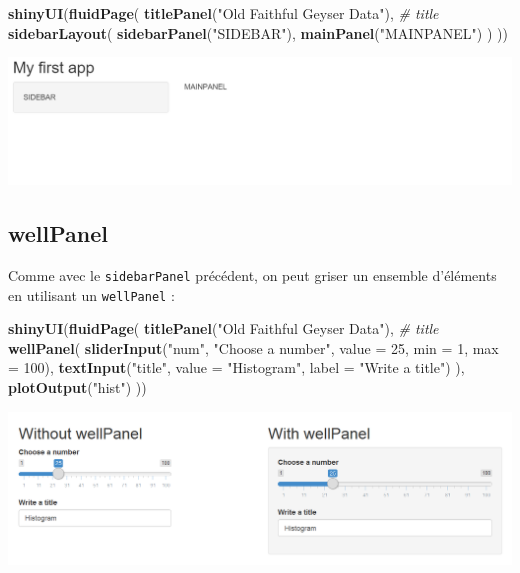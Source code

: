 \documentclass[]{article}
\newenvironment{Shaded}{\begin{snugshade}}{\end{snugshade}}
\newcommand{\KeywordTok}[1]{\textcolor[rgb]{0.13,0.29,0.53}{\textbf{#1}}}
\newcommand{\DataTypeTok}[1]{\textcolor[rgb]{0.13,0.29,0.53}{#1}}
\newcommand{\DecValTok}[1]{\textcolor[rgb]{0.00,0.00,0.81}{#1}}
\newcommand{\StringTok}[1]{\textcolor[rgb]{0.31,0.60,0.02}{#1}}
\newcommand{\CommentTok}[1]{\textcolor[rgb]{0.56,0.35,0.01}{\textit{#1}}}
\newcommand{\NormalTok}[1]{#1}
\begin{document}
\begin{Shaded}
\begin{Highlighting}[]
\KeywordTok{shinyUI}\NormalTok{(}\KeywordTok{fluidPage}\NormalTok{(}
  \KeywordTok{titlePanel}\NormalTok{(}\StringTok{"Old Faithful Geyser Data"}\NormalTok{), }\CommentTok{# title}
  \KeywordTok{sidebarLayout}\NormalTok{(}
    \KeywordTok{sidebarPanel}\NormalTok{(}\StringTok{"SIDEBAR"}\NormalTok{),}
    \KeywordTok{mainPanel}\NormalTok{(}\StringTok{"MAINPANEL"}\NormalTok{)}
\NormalTok{  )}
\NormalTok{))}
\end{Highlighting}
\end{Shaded}

\includegraphics{img/sidabar.png}

\subsection{wellPanel}\label{wellpanel}

Comme avec le \texttt{sidebarPanel} précédent, on peut griser un
ensemble d'éléments en utilisant un \texttt{wellPanel} :

\begin{Shaded}
\begin{Highlighting}[]
\KeywordTok{shinyUI}\NormalTok{(}\KeywordTok{fluidPage}\NormalTok{(}
  \KeywordTok{titlePanel}\NormalTok{(}\StringTok{"Old Faithful Geyser Data"}\NormalTok{), }\CommentTok{# title}
  \KeywordTok{wellPanel}\NormalTok{(}
    \KeywordTok{sliderInput}\NormalTok{(}\StringTok{"num"}\NormalTok{, }\StringTok{"Choose a number"}\NormalTok{, }\DataTypeTok{value =} \DecValTok{25}\NormalTok{, }\DataTypeTok{min =} \DecValTok{1}\NormalTok{, }\DataTypeTok{max =} \DecValTok{100}\NormalTok{),  }
    \KeywordTok{textInput}\NormalTok{(}\StringTok{"title"}\NormalTok{, }\DataTypeTok{value =} \StringTok{"Histogram"}\NormalTok{, }\DataTypeTok{label =} \StringTok{"Write a title"}\NormalTok{)}
\NormalTok{  ),}
  \KeywordTok{plotOutput}\NormalTok{(}\StringTok{"hist"}\NormalTok{)}
\NormalTok{))}
\end{Highlighting}
\end{Shaded}

\includegraphics{img/wellPanel.png}
\end{document}
